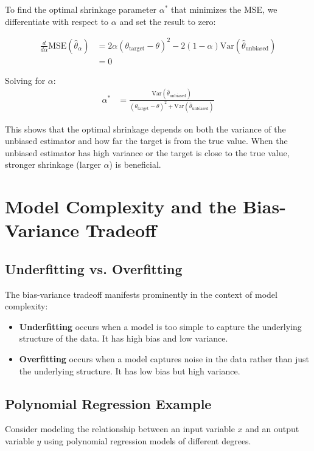 \documentclass{article}
\begin{document}
To find the optimal shrinkage parameter $\alpha^*$ that minimizes the MSE, we differentiate with respect to $\alpha$ and set the result to zero:

\begin{align*}
\frac{d}{d\alpha} \text{MSE}(\hat{\theta}_{\alpha}) &= 2\alpha(\theta_{\text{target}} - \theta)^2 - 2(1-\alpha) \text{Var}(\hat{\theta}_{\text{unbiased}}) \\
&= 0
\end{align*}

Solving for $\alpha$:
\begin{align*}
\alpha^* &= \frac{\text{Var}(\hat{\theta}_{\text{unbiased}})}{(\theta_{\text{target}} - \theta)^2 + \text{Var}(\hat{\theta}_{\text{unbiased}})}
\end{align*}

This shows that the optimal shrinkage depends on both the variance of the unbiased estimator and how far the target is from the true value. When the unbiased estimator has high variance or the target is close to the true value, stronger shrinkage (larger $\alpha$) is beneficial.

\section{Model Complexity and the Bias-Variance Tradeoff}

\subsection{Underfitting vs. Overfitting}

The bias-variance tradeoff manifests prominently in the context of model complexity:

\begin{itemize}
\item \textbf{Underfitting} occurs when a model is too simple to capture the underlying structure of the data. It has high bias and low variance.
\item \textbf{Overfitting} occurs when a model captures noise in the data rather than just the underlying structure. It has low bias but high variance.
\end{itemize}

\subsection{Polynomial Regression Example}

Consider modeling the relationship between an input variable $x$ and an output variable $y$ using polynomial regression models of different degrees.
\end{document}
